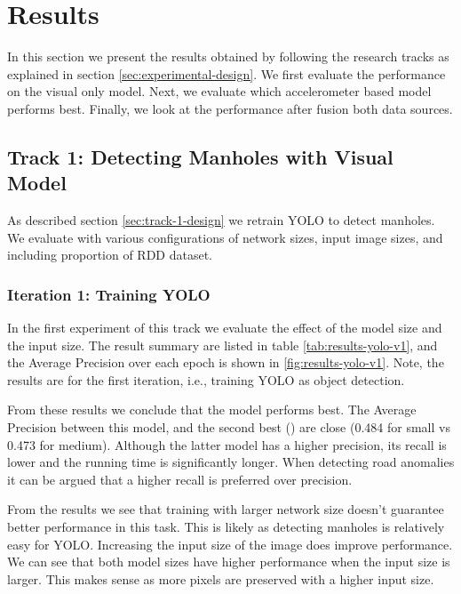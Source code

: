 \clearpage
\section{Results}
\label{sec:results}

In this section we present the results obtained by following the research tracks as explained in section \ref{sec:experimental-design}. We first evaluate the performance on the visual only model. Next, we evaluate which accelerometer based model performs best. Finally, we look at the performance after fusion both data sources.


\subsection{Track 1: Detecting Manholes with Visual Model}

As described section \ref{sec:track-1-design} we retrain YOLO to detect manholes. We evaluate with various configurations of network sizes, input image sizes, and including proportion of RDD dataset. 

\subsubsection{Iteration 1: Training YOLO}

In the first experiment of this track we evaluate the effect of the model size and the input size. The result summary are listed in table \ref{tab:results-yolo-v1}, and the Average Precision over each epoch is shown in \ref{fig:results-yolo-v1}. Note, the results are for the first iteration, i.e., training YOLO as object detection.

From these results we conclude that the model  performs best. The Average Precision between this model, and the second best () are close (0.484 for small vs 0.473 for medium). Although the latter model has a higher precision, its recall is lower and the running time is significantly longer. When detecting road anomalies it can be argued that a higher recall is preferred over precision.

From the results we see that training with larger network size doesn't guarantee better performance in this task. This is likely as detecting manholes is relatively easy for YOLO. Increasing the input size of the image does improve performance. We can see that both model sizes have higher performance when the input size is larger. This makes sense as more pixels are preserved with a higher input size.

